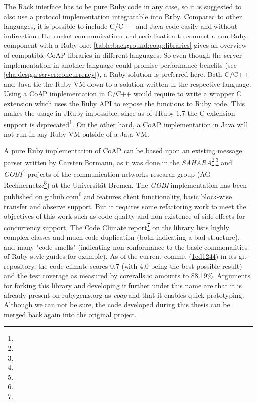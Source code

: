 		The Rack interface has to be pure Ruby code in any case, so it is
		suggested to also use a protocol implementation integratable into Ruby.
		Compared to other languages, it is possible to include C/C++ and Java
		code easily and without indirections like socket communications and
		serialization to connect a non-Ruby component with a Ruby one.
		\autoref{table:background:coap:libraries} gives an overview of
		compatible \ac{CoAP} libraries in different languages. So even though
		the server implementation in another language could promise performance
		benefits (see \autoref{cha:design:server:concurrency}), a Ruby solution
		is preferred here. Both C/C++ and Java tie the Ruby \ac{VM} down to a
		solution written in the respective language. Using a \ac{CoAP}
		implementation in C/C++ would require to write a wrapper C extension
		which uses the Ruby \ac{API} to expose the functions to Ruby code. This
		makes the usage in JRuby impossible, since as of JRuby 1.7 the C
		extension support is deprecated\footnote{\urlJRubyCExt}. On the other
		hand, a \ac{CoAP} implementation in Java will not run in any Ruby
		\ac{VM} outside of a Java \ac{VM}.

		A pure Ruby implementation of \ac{CoAP} can be based upon an existing
		message parser written by Carsten Bormann, as it was done in the
		\emph{SAHARA}\footnote{\urlSaharaOne}\textsuperscript{,}\footnote{\urlSaharaTwo}
		and \emph{GOBI}\footnote{\urlGobi} projects of the communication
		networks research group (AG Rechnernetze\footnote{\urlAgrn}) at the
		Universität Bremen. The \emph{GOBI} implementation has been published
		on github.com\footnote{\urlGobiCoap} and features client functionality,
		basic block-wise transfer and observe support. But it requires some
		refactoring work to meet the objectives of this work such as code
		quality and non-existence of side effects for concurrency support. The
		Code Climate report\footnote{\urlGobiCoapCC} on the library lists
		highly complex classes and much code duplication (both indicating a bad
		structure), and many "code smells" (indicating non-conformance to the
		basic commonalities of Ruby style guides \cite{ruby-style} for
		example). As of the current commit
		(\href{https://github.com/SmallLars/coap/commit/1cd124427b57e84543f3ee6ff2d9148e8499393a}{1cd1244})
		in its git repository, the code climate scores 0.7 (with 4.0 being the
		best possible result) and the test coverage as measured by coveralls.io
		amounts to 88.19\%. Arguments for forking this library and developing
		it further under this name are that it is already present on
		rubygems.org as \emph{coap} and that it enables quick prototyping.
		Although we can not be sure, the code developed during this thesis can
		be merged back again into the original project.
		
